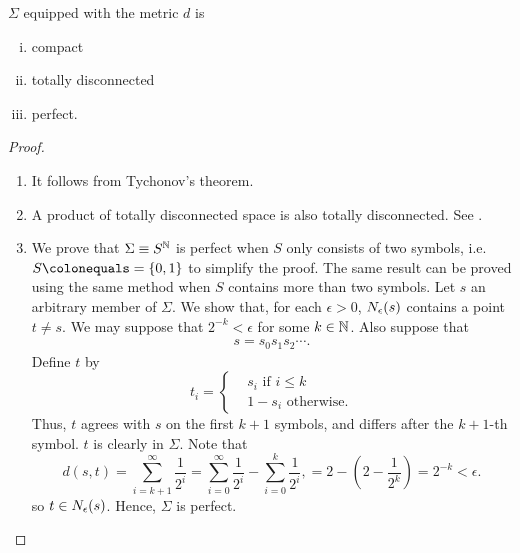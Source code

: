 \documentclass[10pt,twoside]{book}
\begin{document}
\begin{proposition}
  $\Sigma$ equipped with the metric $d$ is 
  \begin{enumerate}[(i)]
    \item compact
    \item totally disconnected
    \item perfect.
  \end{enumerate}
  \begin{proof}
    \begin{enumerate}
      \item 
        It follows from Tychonov's theorem.
      \item
        A product of totally disconnected space is also totally disconnected.
        See \citet{dugundji}.
      \item
        We prove that $\Sigma \equiv S^{\mathbb{N}}$ is perfect when $S$ only consists of two symbols, i.e. $S \ceq = \set{0,1}$ to simplify the proof.
        The same result can be proved using the same method when $S$ contains more than two symbols.
        Let $s$ an arbitrary member of $\Sigma$.
        We show that, for each $\epsilon > 0$, $N_{\epsilon}(s)$ contains a point $t \neq s$.
        We may suppose that $2^{-k} < \epsilon$ for some $k \in \mathbb{N}$.
        Also suppose that
        \begin{align*}
          s = s_0 s_1 s_2 \cdots.
        \end{align*}
        Define $t$ by
        \begin{equation*}
          t_i = \begin{cases}
            &s_i \mbox{ if } i \leq k  \\
            &1 - s_i \mbox{ otherwise.}
          \end{cases}
        \end{equation*}
        Thus, $t$ agrees with $s$ on the first $k+1$ symbols, and differs after the $k+1$-th symbol.
        $t$ is clearly in $\Sigma$.
        Note that
        \begin{equation*}
          d(s,t) = \sum\limits_{i = k+1}^{\infty} \frac{1}{2^i}
          = \sum\limits_{i = 0}^{\infty} \frac{1}{2^i} - \sum\limits_{i = 0}^{k} \frac{1}{2^i},
          = 2 - (2 - \frac{1}{2^{k}})
          = 2^{-k} < \epsilon.
        \end{equation*}
        so $t \in N_{\epsilon}(s)$.
        Hence, $\Sigma$ is perfect.
    \end{enumerate}
  \end{proof}
\end{proposition}
\end{document}
